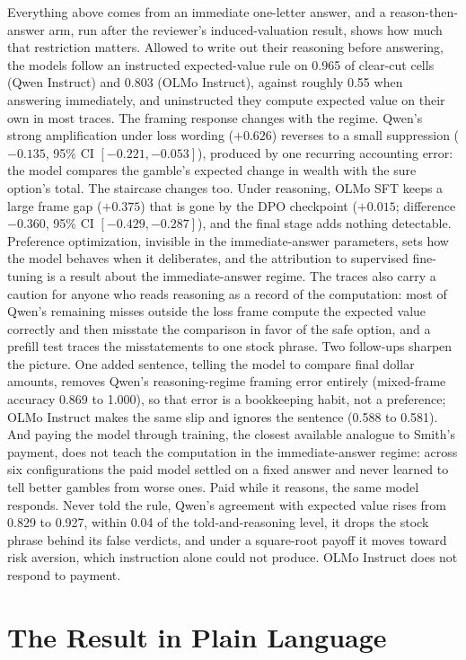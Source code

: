 \documentclass[11pt]{article}
\begin{document}
Everything above comes from an immediate one-letter answer, and a reason-then-answer arm, run after the
reviewer's induced-valuation result, shows how much that restriction matters. Allowed to write out
their reasoning before answering, the models follow an instructed expected-value rule on 0.965 of
clear-cut cells (Qwen Instruct) and 0.803 (OLMo Instruct), against roughly 0.55 when answering
immediately, and uninstructed they compute expected value on their own in most traces. The framing
response changes with the regime. Qwen's strong amplification under loss wording ($+0.626$) reverses to a
small suppression ($-0.135$, 95\% CI $[-0.221, -0.053]$), produced by one recurring accounting error:
the model compares the gamble's expected change in wealth with the sure option's total. The staircase
changes too. Under reasoning, OLMo SFT keeps a large frame gap ($+0.375$) that is gone by the DPO
checkpoint ($+0.015$; difference $-0.360$, 95\% CI $[-0.429, -0.287]$), and the final stage adds nothing
detectable. Preference optimization, invisible in the immediate-answer parameters, sets how the model
behaves when it deliberates, and the attribution to supervised fine-tuning is a result about the
immediate-answer regime. The traces also carry a caution for anyone who reads reasoning as a record of
the computation: most of Qwen's remaining misses outside the loss frame compute the expected value
correctly and then misstate the comparison in favor of the safe option, and a prefill test traces the
misstatements to one stock phrase. Two follow-ups sharpen the picture. One added sentence,
telling the model to compare final dollar amounts, removes Qwen's reasoning-regime framing error
entirely (mixed-frame accuracy 0.869 to 1.000), so that error is a bookkeeping habit, not a preference;
OLMo Instruct makes the same slip and ignores the sentence (0.588 to 0.581). And paying
the model through training, the closest available analogue to Smith's payment, does not teach the
computation in the immediate-answer regime: across six configurations the paid model settled on a
fixed answer and never learned to tell better gambles from worse ones. Paid while it reasons, the same
model responds. Never told the rule, Qwen's agreement with expected value rises from 0.829 to 0.927,
within 0.04 of the told-and-reasoning level, it drops the stock phrase behind its false verdicts, and
under a square-root payoff it moves toward risk aversion, which instruction alone could not produce. OLMo
Instruct does not respond to payment.

\section{The Result in Plain Language}
\end{document}
